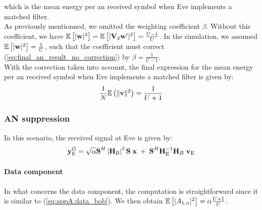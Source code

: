 which is the mean energy per \gls{an} received symbol when Eve implements a matched filter. \\

As previously mentionned, we omitted the weighting coefficient  $\beta$. Without this coefficient, we have $\mathbb{E} \left[ |\boldsymbol{\mathrm{w}}|^2\right]  = \mathbb{E} \left[ |\boldsymbol{\mathrm{V}}_2\boldsymbol{\mathrm{w}}'|^2\right] = \frac{U-1}{U}$.  In the simulation, we assumed $\mathbb{E} \left[ |\boldsymbol{\mathrm{w}}|^2\right]  = \frac{1}{U}$, such that the coefficient must correct  (\ref{eq:final_an_result_no_correction}) by $\beta = \frac{1}{U-1}$. \\
With the correction taken into account, the final expression for the mean energy per \gls{an} received symbol when Eve implements a matched filter is given by:
\begin{equation}
\frac{1}{N}\mathbb{E}\left(\|\boldsymbol{\mathrm{v}}\|^2\right)=\frac{1}{U+1} 
\end{equation}










\subsubsection{AN suppression}
In this scenario, the received signal at Eve is given by:
\begin{equation}
    \textbf{y}_{\text{E}}^G = \sqrt{\alpha} \textbf{S}^H \left|\textbf{H}_{\text{B}}\right|^2 \textbf{S}\; \textbf{x} \; +  \; \textbf{S}^H  \textbf{H}_{\text{E}}^{-1} \textbf{H}_B \;\textbf{v}_{\text{E}}
    \label{eq:appA:rx_eve_filt2}
\end{equation}

\paragraph*{Data component}
In what concerns the data component, the computation is straightforward since it is similar to (\ref{eq:appA:data_bob}). 
We then obtain $ \mathbb{E} \left[|A_{1,n}|^2\right] = \alpha \frac{U+1}{U}$.\\

